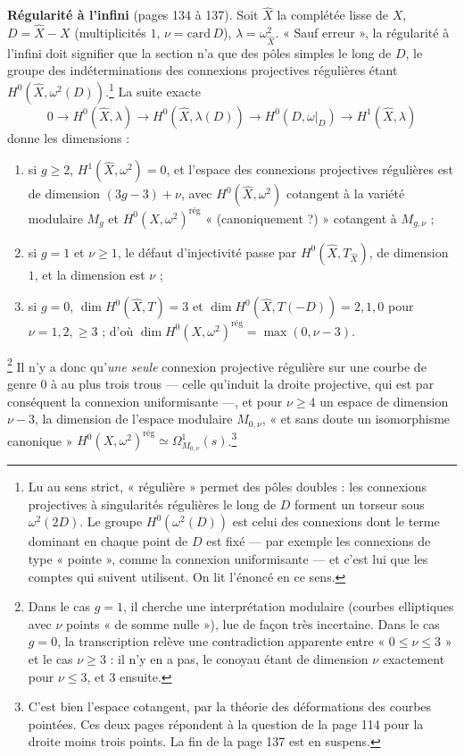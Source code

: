 \documentclass[11pt,a4paper]{article}
\begin{document}
\textbf{Régularité à l'infini} (pages 134 à 137). Soit $\hat X$ la complétée
lisse de $X$, $D = \hat X - X$ (multiplicités $1$, $\nu = \mathrm{card}\,D$),
$\lambda = \omega^2_{\hat X}$. « Sauf erreur », la régularité à l'infini doit
signifier que la section n'a que des pôles simples le long de $D$, le groupe
des indéterminations des connexions projectives régulières étant
$H^0(\hat X, \omega^2(D))$.\footnote{Lu au sens strict, « régulière » permet
des pôles doubles : les connexions projectives à singularités régulières le
long de $D$ forment un torseur sous $\omega^2(2D)$. Le groupe
$H^0(\omega^2(D))$ est celui des connexions dont le terme dominant en chaque
point de $D$ est fixé — par exemple les connexions de type « pointe »,
comme la connexion uniformisante — et c'est lui que les comptes qui suivent
utilisent. On lit l'énoncé en ce sens.} La suite exacte
\[
  0 \to H^0(\hat X, \lambda) \to H^0(\hat X, \lambda(D)) \to
  H^0(D, \omega|_D) \to H^1(\hat X, \lambda)
\]
donne les dimensions :
\begin{enumerate}
  \item[(a)] si $g \geq 2$, $H^1(\hat X, \omega^2) = 0$, et l'espace des
  connexions projectives régulières est de dimension $(3g-3) + \nu$, avec
  $H^0(\hat X, \omega^2)$ cotangent à la variété modulaire $M_g$ et
  $H^0(X, \omega^2)^{\text{rég}}$ « (canoniquement ?) » cotangent à
  $M_{g,\nu}$ ;
  \item[(b)] si $g = 1$ et $\nu \geq 1$, le défaut d'injectivité passe par
  $H^0(\hat X, T_{\hat X})$, de dimension $1$, et la dimension est $\nu$ ;
  \item[(c)] si $g = 0$, $\dim H^0(\hat X, T) = 3$ et $\dim H^0(\hat X,
  T(-D)) = 2, 1, 0$ pour $\nu = 1, 2, \geq 3$ ; d'où
  $\dim H^0(X, \omega^2)^{\text{rég}} = \max(0, \nu - 3)$.
\end{enumerate}
\footnote{Dans le cas $g = 1$, il cherche une interprétation modulaire
(courbes elliptiques avec $\nu$ points « de somme nulle »), lue de façon très
incertaine. Dans le cas $g = 0$, la transcription relève une contradiction
apparente entre « $0 \leq \nu \leq 3$ » et le cas $\nu \geq 3$ : il n'y en a
pas, le conoyau étant de dimension $\nu$ exactement pour $\nu \leq 3$, et $3$
ensuite.}
Il n'y a donc qu'\emph{une seule} connexion projective régulière sur une
courbe de genre $0$ à au plus trois trous — celle qu'induit la droite
projective, qui est par conséquent la connexion uniformisante —, et pour
$\nu \geq 4$ un espace de dimension $\nu - 3$, la dimension de l'espace
modulaire $M_{0,\nu}$, « et sans doute un isomorphisme canonique »
$H^0(X, \omega^2)^{\text{rég}} \simeq \Omega^1_{M_{0,\nu}}(s)$.\footnote{C'est
bien l'espace cotangent, par la théorie des déformations des courbes
pointées. Ces deux pages répondent à la question de la page 114 pour la
droite moins trois points. La fin de la page 137 est en suspens.}
\end{document}
